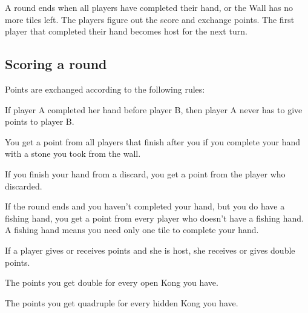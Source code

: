 \documentclass{article}
\begin{document}
A round ends when all players have completed their hand, or the Wall has no more tiles left. The players figure out the score and exchange points. The first player that completed their hand becomes host for the next turn.

\subsection{Scoring a round}
Points are exchanged according to the following rules:
\begin{itemize*}
    \item If player A completed her hand before player B, then player A never has to give points to player B.
    \item You get a point from all players that finish after you if you complete your hand with a stone you took from the wall.
    \item If you finish your hand from a discard, you get a point from the player who discarded.
    \item If the round ends and you haven't completed your hand, but you do have a fishing hand, you get a point from every player who doesn't have a fishing hand. A fishing hand means you need only one tile to complete your hand.
    \item If a player gives or receives points and she is host, she receives or gives double points.
    \item The points you get double for every open Kong you have.
    \item The points you get quadruple for every hidden Kong you have.

\end{itemize*}

\end{document}
